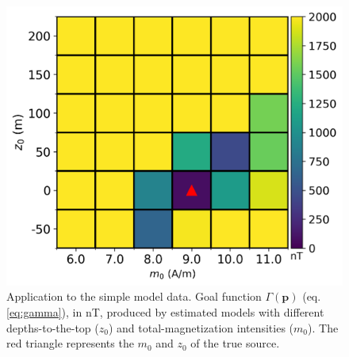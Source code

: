 \begin{figure}
	\centering
	\includegraphics[scale=.75]{figures/simple_gamma.png}
	\caption{Application to the simple model data. 
	Goal function $\Gamma(\mathbf{p})$ (eq. \ref{eq:gamma}), in nT,  
	produced by estimated models with different depths-to-the-top ($ z_0 $) and 
	total-magnetization intensities ($ m_0 $). 
	The red triangle represents the $m_0$ and $z_0$ of the true source.}
	\label{fig:simple_map}
\end{figure}

